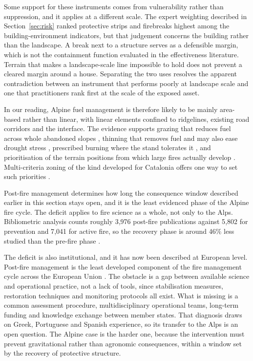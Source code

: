 \documentclass[11pt,a4paper]{article}
\begin{document}
Some support for these instruments comes from vulnerability rather than suppression, and it applies at a different scale. The expert weighting described in Section~\ref{sec:risk} ranked protective strips and firebreaks highest among the building-environment indicators, but that judgement concerns the building rather than the landscape. A break next to a structure serves as a defensible margin, which is not the containment function evaluated in the effectiveness literature. Terrain that makes a landscape-scale line impossible to hold does not prevent a cleared margin around a house. Separating the two uses resolves the apparent contradiction between an instrument that performs poorly at landscape scale and one that practitioners rank first at the scale of the exposed asset.

In our reading, Alpine fuel management is therefore likely to be mainly area-based rather than linear, with linear elements confined to ridgelines, existing road corridors and the interface. The evidence supports grazing that reduces fuel across whole abandoned slopes \citep{rouetleduc_effects_2021}, thinning that removes fuel and may also ease drought stress \citep{giuggiola_droughtinduced_2010}, prescribed burning where the stand tolerates it \citep{gamba_prescribed_2025}, and prioritisation of the terrain positions from which large fires actually develop \citep{conedera_linking_2024}. Multi-criteria zoning of the kind developed for Catalonia offers one way to set such priorities \citep{krsnik_spatial_2024}.

Post-fire management determines how long the consequence window described earlier in this section stays open, and it is the least evidenced phase of the Alpine fire cycle. The deficit applies to fire science as a whole, not only to the Alps. Bibliometric analysis counts roughly 3{,}976 post-fire publications against 5{,}802 for prevention and 7{,}041 for active fire, so the recovery phase is around 46\% less studied than the pre-fire phase \citep{goncalves_fostering_2025}.

The deficit is also institutional, and it has now been described at European level. Post-fire management is the least developed component of the fire management cycle across the European Union \citep{vieira_postfire_2026}. The obstacle is a gap between available science and operational practice, not a lack of tools, since stabilisation measures, restoration techniques and monitoring protocols all exist. What is missing is a common assessment procedure, multidisciplinary operational teams, long-term funding and knowledge exchange between member states. That diagnosis draws on Greek, Portuguese and Spanish experience, so its transfer to the Alps is an open question. The Alpine case is the harder one, because the intervention must prevent gravitational rather than agronomic consequences, within a window set by the recovery of protective structure.
\end{document}

